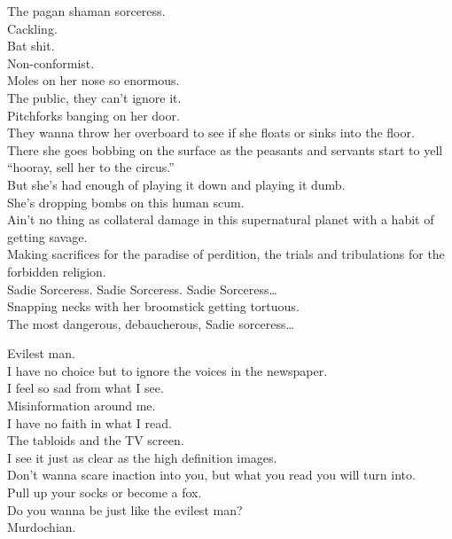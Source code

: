 The pagan shaman sorceress. \\
Cackling. \\
Bat shit. \\
Non-conformist. \\
Moles on her nose so enormous. \\
The public, they can't ignore it. \\
Pitchforks banging on her door. \\
They wanna throw her overboard to see if she floats or sinks into the floor. \\
There she goes bobbing on the surface as the peasants and servants start to yell ``hooray, sell her to the circus.'' \\
But she's had enough of playing it down and playing it dumb. \\
She's dropping bombs on this human scum. \\
Ain't no thing as collateral damage in this supernatural planet with a habit of getting savage. \\
Making sacrifices for the paradise of perdition, the trials and tribulations for the forbidden religion. \\

Sadie Sorceress. Sadie Sorceress. Sadie Sorceress… \\
Snapping necks with her broomstick getting tortuous. \\

The most dangerous, debaucherous, Sadie sorceress… \\




Evilest man. \\

I have no choice but to ignore the voices in the newspaper. \\
I feel so sad from what I see. \\
Misinformation around me. \\

I have no faith in what I read. \\
The tabloids and the TV screen. \\
I see it just as clear as the high definition images. \\

Don't wanna scare inaction into you, but what you read you will turn into. \\
Pull up your socks or become a fox. \\
Do you wanna be just like the evilest man? \\
Murdochian. \\


